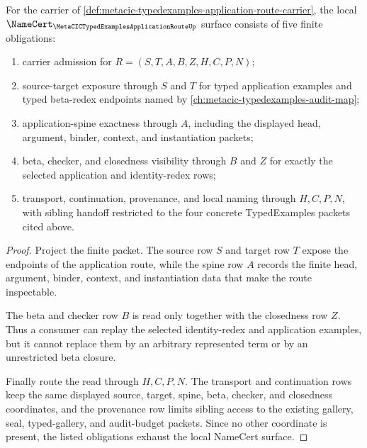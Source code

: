\begin{theorem}
\label{thm:metacic-typedexamples-application-route-namecert-obligations}
For the carrier of \autoref{def:metacic-typedexamples-application-route-carrier}, the local $\NameCert_{\MetaCICTypedExamplesApplicationRouteUp}$ surface consists of five finite obligations:
\begin{enumerate}
\item carrier admission for $R=(S,T,A,B,Z,H,C,P,N)$;
\item source-target exposure through $S$ and $T$ for typed application examples and typed beta-redex endpoints named by \autoref{ch:metacic-typedexamples-audit-map};
\item application-spine exactness through $A$, including the displayed head, argument, binder, context, and instantiation packets;
\item beta, checker, and closedness visibility through $B$ and $Z$ for exactly the selected application and identity-redex rows;
\item transport, continuation, provenance, and local naming through $H,C,P,N$, with sibling handoff restricted to the four concrete TypedExamples packets cited above.
\end{enumerate}
\end{theorem}
\begin{proof}
Project the finite packet. The source row $S$ and target row $T$ expose the endpoints of the application route, while the spine row $A$ records the finite head, argument, binder, context, and instantiation data that make the route inspectable.

The beta and checker row $B$ is read only together with the closedness row $Z$. Thus a consumer can replay the selected identity-redex and application examples, but it cannot replace them by an arbitrary represented term or by an unrestricted beta closure.

Finally route the read through $H,C,P,N$. The transport and continuation rows keep the same displayed source, target, spine, beta, checker, and closedness coordinates, and the provenance row limits sibling access to the existing gallery, seal, typed-gallery, and audit-budget packets. Since no other coordinate is present, the listed obligations exhaust the local NameCert surface.
\end{proof}

